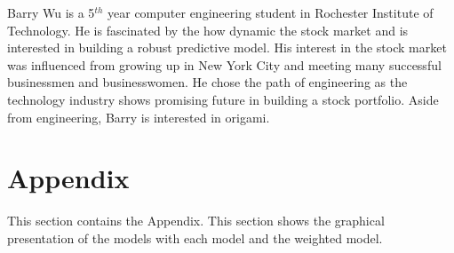 \documentclass[journal]{IEEEtran}
\begin{document}
\begin{IEEEbiographynophoto}{Barry Wu}
is a 5$^{th}$ year computer engineering student in Rochester Institute of Technology. He is fascinated by the how dynamic the stock market and is interested in building a robust predictive model. His interest in the stock market was influenced from growing up in New York City and meeting many successful businessmen and businesswomen. He chose the path of engineering as the technology industry shows promising future in building a stock portfolio. Aside from engineering, Barry is interested in origami.
\end{IEEEbiographynophoto}

\section{Appendix}
This section contains the Appendix. This section shows the graphical presentation of the models with each model and the weighted model. 

%
%
\end{document}
